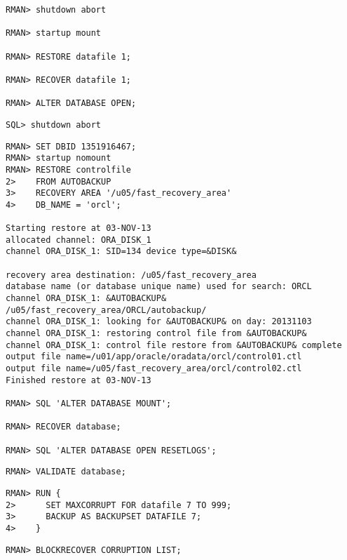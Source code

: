 \begin{enumerate}
\begin{lstlisting}[caption={Recovern der Systemdatendatei},language=rman,alsolanguage=sqlplus,emph={[9]ALTER,DATABASE,OPEN},emphstyle={[9]\color{magenta}\bfseries}]
RMAN> shutdown abort

RMAN> startup mount

RMAN> RESTORE datafile 1;

RMAN> RECOVER datafile 1;

RMAN> ALTER DATABASE OPEN;
      \end{lstlisting}
\clearpage
    
      \begin{lstlisting}[caption={Herunterfahren der Datenbank in SQL*Plus},language=oracle_sql,alsolanguage=sqlplus]
SQL> shutdown abort
      \end{lstlisting}
      \begin{lstlisting}[caption={Recovern der Kontrolldateien},language=rman,alsolanguage=sqlplus,emph={[9]ALTER,DATABASE, MOUNT,OPEN,RESETLOGS},emphstyle={[9]\color{magenta}\bfseries}]
RMAN> SET DBID 1351916467;
RMAN> startup nomount
RMAN> RESTORE controlfile
2>    FROM AUTOBACKUP
3>    RECOVERY AREA '/u05/fast_recovery_area'
4>    DB_NAME = 'orcl';

Starting restore at 03-NOV-13
allocated channel: ORA_DISK_1
channel ORA_DISK_1: SID=134 device type=&DISK&

recovery area destination: /u05/fast_recovery_area
database name (or database unique name) used for search: ORCL
channel ORA_DISK_1: &AUTOBACKUP& /u05/fast_recovery_area/ORCL/autobackup/
channel ORA_DISK_1: looking for &AUTOBACKUP& on day: 20131103
channel ORA_DISK_1: restoring control file from &AUTOBACKUP&
channel ORA_DISK_1: control file restore from &AUTOBACKUP& complete
output file name=/u01/app/oracle/oradata/orcl/control01.ctl
output file name=/u05/fast_recovery_area/orcl/control02.ctl
Finished restore at 03-NOV-13

RMAN> SQL 'ALTER DATABASE MOUNT';

RMAN> RECOVER database;

RMAN> SQL 'ALTER DATABASE OPEN RESETLOGS';
      \end{lstlisting}

    
    
      \begin{lstlisting}[caption={Validieren der Datenbank},language=rman]
RMAN> VALIDATE database;

      \end{lstlisting}
    
      \begin{lstlisting}[caption={Validieren der Datenbank},language=rman]
RMAN> RUN {
2>      SET MAXCORRUPT FOR datafile 7 TO 999;
3>      BACKUP AS BACKUPSET DATAFILE 7;
4>    }
      \end{lstlisting}
    
      \begin{lstlisting}[caption={Recovern der Datendatei},language=rman]
RMAN> BLOCKRECOVER CORRUPTION LIST;
      \end{lstlisting}
  \end{enumerate}